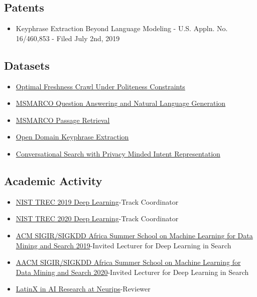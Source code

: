\documentclass[line,margin]{res}
\begin{document}
\begin{resume}
\subsection{Patents}
\begin{itemize}
\itemsep -5pt
\item Keyphrase Extraction Beyond Language Modeling - U.S. Appln. No. 16/460,853 - Filed July 2nd, 2019
\end{itemize}
\subsection{Datasets}
\begin{itemize} 
\itemsep -5pt
\item \href{https://github.com/microsoft/MSMARCO-Optimal-Freshness-Crawl-Under-Politeness-Constraints}{Optimal Freshness Crawl Under Politeness Constraints}
\item \href{https://github.com/microsoft/MSMARCO-Question-Answering}{MSMARCO Question Answering and Natural Language Generation}
\item \href{https://github.com/microsoft/MSMARCO-Passage-Ranking}{MSMARCO Passage Retrieval}
\item \href{https://github.com/microsoft/OpenKP}{Open Domain Keyphrase Extraction}
\item \href{https://github.com/microsoft/MSMARCO-Conversational-Search}{Conversational Search with Privacy Minded Intent Representation}
\end{itemize}
\subsection{Academic Activity}
\begin{itemize} 
\itemsep -5pt
\item  \href{https://trec.nist.gov/pubs/call2019.html}{NIST TREC 2019 Deep Learning}-Track Coordinator
\item  \href{https://trec.nist.gov/pubs/call2020.html}{NIST TREC 2020 Deep Learning}-Track Coordinator
\item \href{http://sigir.org/afirm2019/}{ACM SIGIR/SIGKDD Africa Summer School on Machine Learning for Data Mining and Search 2019}-Invited Lecturer for Deep Learning in Search
\item \href{http://sigir.org/afirm2020/}{AACM SIGIR/SIGKDD Africa Summer School on Machine Learning for Data Mining and Search 2020}-Invited Lecturer for Deep Learning in Search
\item \href{http://www.latinxinai.org/neurips-2019}{LatinX in AI Research at Neurips}-Reviewer
\end{itemize}
\end{resume}
\end{document}

